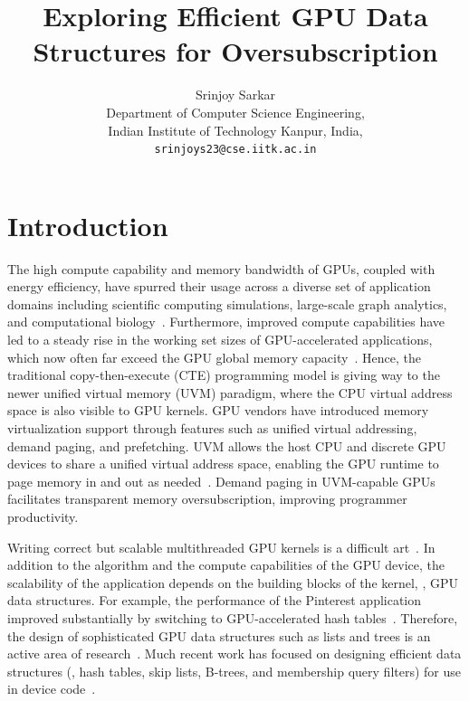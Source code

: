 \documentclass[12pt,a4paper]{article}
\title{Exploring Efficient GPU Data Structures for Oversubscription}
\author{Srinjoy Sarkar \\
    Department of Computer Science Engineering, \\
Indian Institute of Technology Kanpur, India,  \\
\texttt{srinjoys23@cse.iitk.ac.in}}
\date{} %
\begin{document}
\maketitle
\thispagestyle{fancy}

\section*{Introduction}

The high compute capability and memory bandwidth of GPUs, coupled with energy
efficiency, have spurred their usage across a diverse set of application domains
including scientific computing simulations, large-scale graph
analytics, and computational biology~\cite{nvidia-applications, tensorflow-2015, metacache-icpp-2021}.
Furthermore, improved compute capabilities have led to a steady rise in the
working set sizes of GPU-accelerated applications, which now often far exceed
the GPU global memory capacity~\cite{dynamap,uvm-forest-isca25}. Hence, the
traditional copy-then-execute (CTE) programming model is giving way to the newer
unified virtual memory (UVM) paradigm, where the CPU virtual address space is
also visible to GPU kernels. GPU vendors have introduced memory virtualization
support through features such as unified virtual addressing, demand paging, and
prefetching. UVM allows the host CPU and discrete GPU devices to share a unified
virtual address space, enabling the GPU runtime to page memory in and out as
needed~\cite{hum-ppopp-2020,dynamap}. Demand paging in UVM-capable GPUs
facilitates transparent memory oversubscription, improving programmer
productivity.

Writing correct but scalable multithreaded GPU kernels is a difficult art~\cite{massively-parallel-processors-v4,kernelbench-arxiv}. In addition to the algorithm and the compute capabilities of the GPU device, the scalability of the application depends on the building blocks of the kernel, \eg, GPU data structures. For example, the performance of the Pinterest application improved substantially by switching to GPU-accelerated hash tables~\cite{pinterest-perf-boost}. Therefore, the design of sophisticated GPU data structures such as lists and trees is an active area of research~\cite{gpu-gems2}. Much recent work has focused on designing efficient data structures (\eg, hash tables, skip lists, B-trees, and membership query filters) for use in device code~\cite{slabhash-ipdps-2020,dachash-sbacpad-2021,warpcore-hipc-2020,warpdrive,parallel-hashmap-nvidia,survey-hashing-tpds-2020,bght,dycuckoo,gph-pamd-2025,gfsl-pact-2017,cmedia-skiplist-ipdpsw-2019,skiplist-survey-2025,multiversion-gpu-btree,gpu-filters-ppopp23,harmonia-gpu,gpu-btree,gpu-gelhash,survey-hashing-tpds-2020,lockfree-ds-icpads-2012,quotient-filter,stdgpu,cucollections-nvidia,gpu-cds}.
\end{document}
